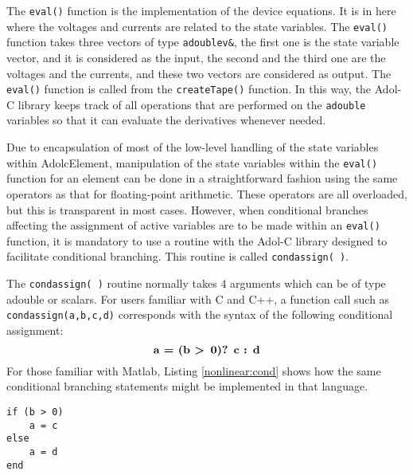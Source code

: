 The \texttt{eval()} function is the implementation of the device
equations. It is in here where the voltages and currents are
related to the state variables. The \texttt{eval()} function takes
three vectors of type \texttt{adoublev\&}, the first one is the
state variable vector, and it is considered as the input, the
second and the third one are the voltages and the currents, and
these two vectors are considered as output. The \texttt{eval()}
function is  called from the \texttt{createTape()} function. In
this way, the Adol-C library keeps track of all operations that
are performed on the \texttt{adouble} variables so that it can
evaluate the derivatives whenever needed. \newline
%

Due to encapsulation of most of the low-level handling of
the state variables within AdolcElement, manipulation of the
state variables within the \texttt{eval()} function for an element can
be done in a straightforward fashion using the same operators
as that for floating-point arithmetic.  These operators are all
overloaded, but this is transparent in most cases.  However,
when conditional branches affecting the assignment of active
variables are to be made within an \texttt{eval()}
function, it is mandatory to use a routine with the Adol-C
library designed to facilitate conditional branching.  This
routine is called \texttt{condassign(~)}.

The \texttt{condassign(~)} routine normally takes 4 arguments
which can be of type adouble or scalars.  For users familiar
with C and C++, a function call such as \texttt{condassign(a,b,c,d)}
corresponds with the syntax of the following conditional
assignment:
\newline
\[\textbf{a = (b \textgreater$\,$ 0)? c : d}\]
\newline
For those familiar with Matlab, Listing \ref{nonlinear:cond}
shows how the same conditional branching statements might
be implemented in that language.
\lstset{language=Matlab} %
\begin{lstlisting}[firstnumber=1, label={nonlinear:cond},
    caption={Matlab equivalent of \texttt{condassign()}}]
if (b > 0)
    a = c
else
    a = d
end
\end{lstlisting}

